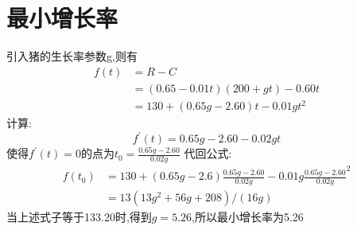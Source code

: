 \documentclass[lang=cn,11pt,a4paper]{elegantpaper}
\begin{document}
\section{最小增长率}
引入猪的生长率参数g,则有\begin{align*}
    f(t) &=R-C \\ 
    &=(0.65-0.01t)(200+gt)-0.60t\\
    &=130+(0.65g-2.60)t-0.01gt^2
\end{align*}
计算: \[f^{'}(t)=0.65g-2.60-0.02gt\]
使得\(f^{'}(t) = 0\)的点为\(t_0 = \frac{0.65g-2.60}{0.02g}\) 
代回公式:
\begin{align*}
    f(t_0) &= 130 + (0.65g -2.6)\frac{0.65g-2.60}{0.02g} -0.01g {\frac{0.65g-2.60}{0.02g}}^2 \\ 
     &=  13\left(13 g^{2} +56 g+208\right) /(16 g)
\end{align*}
当上述式子等于133.20时,得到\(g = 5.26\),所以最小增长率为5.26
\end{document}
